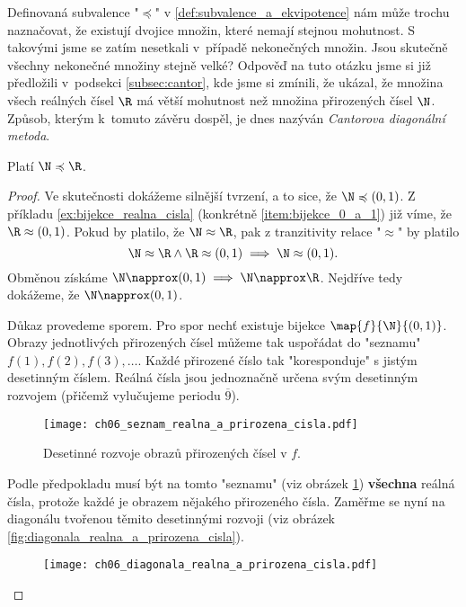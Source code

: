 Definovaná subvalence "$\preccurlyeq$" v \ref{def:subvalence_a_ekvipotence} nám může trochu naznačovat, že existují dvojice množin, které nemají stejnou mohutnost. S takovými jsme se zatím nesetkali v~případě nekonečných množin. Jsou skutečně všechny nekonečné množiny stejně velké? Odpověď na tuto otázku jsme si již předložili v~podsekci \ref{subsec:cantor}, kde jsme si zmínili, že  ukázal, že množina všech reálných čísel $\R$ má větší mohutnost než množina přirozených čísel $\N$. Způsob, kterým k~tomuto závěru dospěl, je dnes nazýván \emph{Cantorova diagonální metoda}.
\begin{theorem}\label{thm:N_a_R}
    Platí $\N\preccurlyeq\R$.
\end{theorem}
\begin{proof}
    Ve skutečnosti dokážeme silnější tvrzení, a to sice, že $\N\preccurlyeq(0,1)$. Z příkladu \ref{ex:bijekce_realna_cisla} (konkrétně \ref{item:bijekce_0_a_1}) již víme, že $\R\approx(0,1)$. Pokud by platilo, že $\N\approx\R$, pak z tranzitivity relace "$\approx$" by platilo
    \begin{equation*}
        \N\approx\R \land \R\approx(0,1) \implies \N\approx(0,1).
    \end{equation*}
    Obměnou získáme $\N\napprox(0,1)\implies\N\napprox\R$. Nejdříve tedy dokážeme, že $\N\napprox(0,1)$.\par
    Důkaz provedeme sporem. Pro spor nechť existuje bijekce $\map{f}{\N}{(0,1)}$. Obrazy jednotlivých přirozených čísel můžeme tak uspořádat do "seznamu" $f(1),f(2),f(3),\dots$. Každé přirozené číslo tak "koresponduje" s jistým desetinným číslem. Reálná čísla jsou jednoznačně určena svým desetinným rozvojem (přičemž vylučujeme periodu $\overline{9}$).
    \begin{figure}[H]
        \centering
        \texttt{[image: ch06\_seznam\_realna\_a\_prirozena\_cisla.pdf]}
        \caption{Desetinné rozvoje obrazů přirozených čísel v $f$.}
        \label{fig:seznam_realna_a_prirozena_cisla}
    \end{figure}
    Podle předpokladu musí být na tomto "seznamu" (viz obrázek \ref{fig:seznam_realna_a_prirozena_cisla}) \textbf{všechna} reálná čísla, protože každé je obrazem nějakého přirozeného čísla. Zaměřme se nyní na diagonálu tvořenou těmito desetinnými rozvoji (viz obrázek \ref{fig:diagonala_realna_a_prirozena_cisla}).
    \begin{figure}[H]
        \centering
        \texttt{[image: ch06\_diagonala\_realna\_a\_prirozena\_cisla.pdf]}

\end{figure}
\end{proof}
